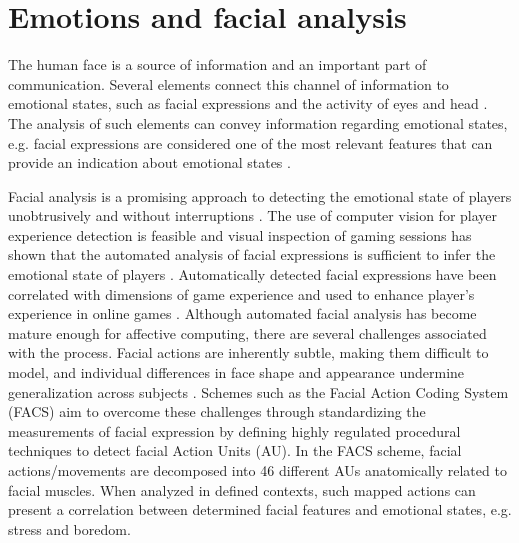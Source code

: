 \chapter{Emotions and facial analysis}
\label{ch:literature-face}

The human face is a source of information and an important part of communication. Several elements connect this channel of information to emotional states, such as facial expressions and the activity of eyes and head \parencite{akakin2010spatiotemporal}. The analysis of such elements can convey information regarding emotional states, e.g. facial expressions are considered one of the most relevant features that can provide an indication about emotional states \parencite{cowie2001emotion}.

Facial analysis is a promising approach to detecting the emotional state of players unobtrusively and without interruptions \parencite{cohn2014automated}. The use of computer vision for player experience detection is feasible and visual inspection of gaming sessions has shown that the automated analysis of facial expressions is sufficient to infer the emotional state of players \parencite{tan2012feasibility,tan2014inferring}. Automatically detected facial expressions have been correlated with dimensions of game experience \parencite{tan2014correlation} and used to enhance player's experience in online games \parencite{zhou2004real,zhan2008real}. Although automated facial analysis has become mature enough for affective computing, there are several challenges associated with the process. Facial actions are inherently subtle, making them difficult to model, and individual differences in face shape and appearance undermine generalization across subjects \parencite{cohn2014automated}. Schemes such as the Facial Action Coding System (FACS) \parencite{ekman1977facial,cohn2007observer} aim to overcome these challenges through standardizing the measurements of facial expression by defining highly regulated procedural techniques to detect facial Action Units (AU). In the FACS scheme, facial actions/movements are decomposed into 46 different AUs anatomically related to facial muscles. When analyzed in defined contexts, such mapped actions can present a correlation between determined facial features and emotional states, e.g. stress and boredom.

